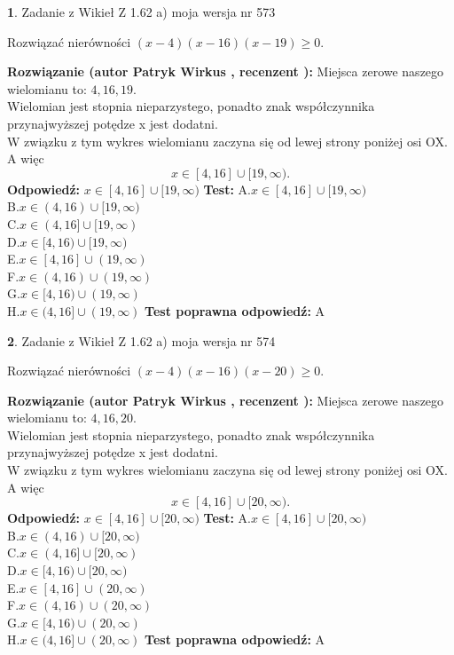 \documentclass[12pt, a4paper]{article}
\theoremstyle{definition} %
\newtheorem{zad}{}
\newcommand{\zadStart}[1]{\begin{zad}#1\newline}
\newcommand{\zadStop}{\end{zad}}
\newcommand{\rozwStart}[2]{\noindent \textbf{Rozwiązanie (autor #1 , recenzent #2): }\newline}
\newcommand{\rozwStop}{\newline}
\newcommand{\odpStart}{\noindent \textbf{Odpowiedź:}\newline}
\newcommand{\odpStop}{\newline}
\newcommand{\testStart}{\noindent \textbf{Test:}\newline}
\newcommand{\testStop}{\newline}
\newcommand{\kluczStart}{\noindent \textbf{Test poprawna odpowiedź:}\newline}
\newcommand{\kluczStop}{\newline}
\begin{document}
\zadStart{Zadanie z Wikieł Z 1.62 a) moja wersja nr 573}

Rozwiązać nierówności $(x-4)(x-16)(x-19)\ge0$.
\zadStop
\rozwStart{Patryk Wirkus}{}
Miejsca zerowe naszego wielomianu to: $4, 16, 19$.\\
Wielomian jest stopnia nieparzystego, ponadto znak współczynnika przy\linebreak najwyższej potędze x jest dodatni.\\ W związku z tym wykres wielomianu zaczyna się od lewej strony poniżej osi OX. A więc $$x \in [4,16] \cup [19,\infty).$$
\rozwStop
\odpStart
$x \in [4,16] \cup [19,\infty)$
\odpStop
\testStart
A.$x \in [4,16] \cup [19,\infty)$\\
B.$x \in (4,16) \cup [19,\infty)$\\
C.$x \in (4,16] \cup [19,\infty)$\\
D.$x \in [4,16) \cup [19,\infty)$\\
E.$x \in [4,16] \cup (19,\infty)$\\
F.$x \in (4,16) \cup (19,\infty)$\\
G.$x \in [4,16) \cup (19,\infty)$\\
H.$x \in (4,16] \cup (19,\infty)$
\testStop
\kluczStart
A
\kluczStop



\zadStart{Zadanie z Wikieł Z 1.62 a) moja wersja nr 574}

Rozwiązać nierówności $(x-4)(x-16)(x-20)\ge0$.
\zadStop
\rozwStart{Patryk Wirkus}{}
Miejsca zerowe naszego wielomianu to: $4, 16, 20$.\\
Wielomian jest stopnia nieparzystego, ponadto znak współczynnika przy\linebreak najwyższej potędze x jest dodatni.\\ W związku z tym wykres wielomianu zaczyna się od lewej strony poniżej osi OX. A więc $$x \in [4,16] \cup [20,\infty).$$
\rozwStop
\odpStart
$x \in [4,16] \cup [20,\infty)$
\odpStop
\testStart
A.$x \in [4,16] \cup [20,\infty)$\\
B.$x \in (4,16) \cup [20,\infty)$\\
C.$x \in (4,16] \cup [20,\infty)$\\
D.$x \in [4,16) \cup [20,\infty)$\\
E.$x \in [4,16] \cup (20,\infty)$\\
F.$x \in (4,16) \cup (20,\infty)$\\
G.$x \in [4,16) \cup (20,\infty)$\\
H.$x \in (4,16] \cup (20,\infty)$
\testStop
\kluczStart
A
\kluczStop
\end{document}
